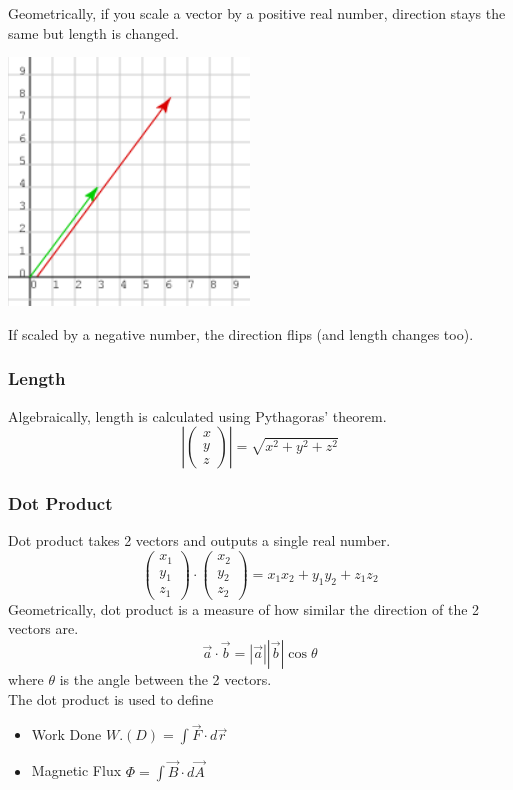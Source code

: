 \documentclass{article}
\begin{document}
Geometrically, if you scale a vector by a positive real number, direction stays the same but length is changed. \\
\begin{center}
    \includegraphics[width=0.3\linewidth]{images/scalingvector.png}
\end{center}
If scaled by a negative number, the direction flips (and length changes too).

\subsubsection{Length}
Algebraically, length is calculated using Pythagoras' theorem.
$$\left| \left(
    \begin{array}{c}  
         x \\
          y \\
          z
    \end{array}
    \right) \right| = \sqrt{x^2 + y^2 + z^2}
    $$

\subsubsection{Dot Product}
Dot product takes 2 vectors and outputs a single real number.
$$\left(
    \begin{array}{c}  
         x_1 \\
         y_1 \\
         z_1
    \end{array}
    \right) \cdot \left(
    \begin{array}{c}  
         x_2 \\
         y_2 \\
         z_2
    \end{array}
    \right) = x_1 x_2 + y_1 y_2 + z_1 z_2 
$$
Geometrically, dot product is a measure of how similar the direction of the 2 vectors are.
$$\vec{a} \cdot \vec{b} = |\vec{a}| |\vec{b}| \cos \theta $$
where $\theta$ is the angle between the 2 vectors.\\[10pt]
The dot product is used to define 
\begin{itemize}
    \item Work Done $W.(D) = \int \vec{F} \cdot d\vec{r}$
    \item Magnetic Flux $\Phi = \int \vec{B} \cdot d\vec{A}$
\end{itemize}
\end{document}
